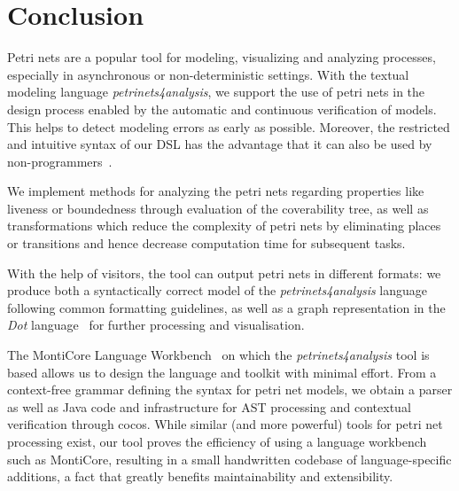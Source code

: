 
\section{Conclusion}

Petri nets are a popular tool for modeling, visualizing and analyzing processes, especially in asynchronous or non-deterministic settings. With the textual modeling language \emph{petrinets4analysis}, we support the use of petri nets in the design process enabled by the automatic and continuous verification of models. This helps to detect modeling errors as early as possible. Moreover, the restricted and intuitive syntax of our DSL has the advantage that it can also be used by non-programmers~\cite{karsai2014design}.

We implement methods for analyzing the petri nets regarding properties like liveness or boundedness through evaluation of the coverability tree, as well as transformations which reduce the complexity of petri nets by eliminating places or transitions and hence decrease computation time for subsequent tasks.

With the help of visitors, the tool can output petri nets in different formats: we produce both a syntactically correct model of the \emph{petrinets4analysis} language following common formatting guidelines, as well as a graph representation in the \emph{Dot} language~\cite{gansner2000open} for further processing and visualisation.

The MontiCore Language Workbench~\cite{rumpe2017monticore} on which the \emph{petrinets4analysis} tool is based allows us to design the language and toolkit with minimal effort. From a context-free grammar defining the syntax for petri net models, we obtain a parser as well as Java code and infrastructure for AST processing and contextual verification through cocos. While similar (and more powerful) tools for petri net processing exist, our tool proves the efficiency of using a language workbench such as MontiCore, resulting in a small handwritten codebase of language-specific additions, a fact that greatly benefits maintainability and extensibility.
